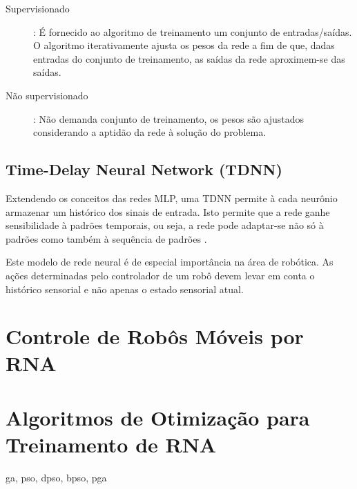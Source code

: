 \begin{description}
    \item[Supervisionado]: É fornecido ao algoritmo de treinamento um conjunto de entradas/saídas. O algoritmo iterativamente ajusta os pesos da rede a fim de que, dadas entradas do conjunto de treinamento, as saídas da rede aproximem-se das saídas.
    \item[Não supervisionado]: Não demanda conjunto de treinamento, os pesos
são ajustados considerando a aptidão da rede à solução do problema.
\end{description}

\subsection{Time-Delay Neural Network (TDNN)}

Extendendo os conceitos das redes MLP, uma TDNN permite à cada neurônio armazenar um
histórico dos sinais de entrada. Isto permite que a rede ganhe sensibilidade à padrões temporais, ou seja, a rede pode adaptar-se não só à padrões como também à sequência de padrões \cite{kaiser94tdnn}.

Este modelo de rede neural é de especial importância na área de robótica. As ações determinadas pelo controlador de um robô devem levar em conta o histórico sensorial e não apenas o estado sensorial atual.

\section{Controle de Robôs Móveis por RNA}



\section{Algoritmos de Otimização para Treinamento de RNA}
\label{optimization-algorithms}

ga, pso, dpso, bpso, pga